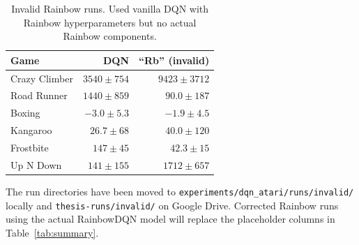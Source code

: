 \documentclass[11pt]{article}
\begin{document}
\begin{table}[H]
\centering
\renewcommand{\arraystretch}{1.7}
\setlength{\tabcolsep}{10pt}
\begin{tabular}{l rr}
\toprule
\textbf{Game}
  & \textbf{DQN}
  & \textbf{``Rb'' (invalid)} \\
\midrule
Crazy Climber  & $3540 \pm 754$   & $9423 \pm 3712$ \\
Road Runner    & $1440 \pm 859$   & $90.0 \pm 187$  \\
Boxing         & $-3.0 \pm 5.3$   & $-1.9 \pm 4.5$  \\
Kangaroo       & $26.7 \pm 68$    & $40.0 \pm 120$  \\
Frostbite      & $147 \pm 45$     & $42.3 \pm 15$   \\
Up N Down      & $141 \pm 155$    & $1712 \pm 657$   \\
\bottomrule
\end{tabular}
\caption{Invalid Rainbow runs. Used vanilla DQN with Rainbow
hyperparameters but no actual Rainbow components.}
\label{tab:invalid-rainbow}
\end{table}

\noindent The run directories have been moved to
\texttt{experiments/dqn\_atari/runs/invalid/} locally and
\texttt{thesis-runs/invalid/} on Google Drive. Corrected Rainbow runs
using the actual RainbowDQN model will replace the placeholder columns
in Table~\ref{tab:summary}.
\end{document}
